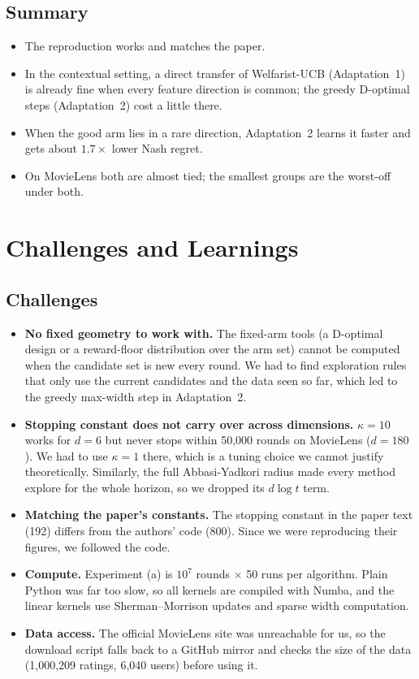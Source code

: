 \documentclass[11pt,a4paper]{article}
\begin{document}
\subsection{Summary}
\begin{itemize}
  \item The reproduction works and matches the paper.
  \item In the contextual setting, a direct transfer of Welfarist-UCB (Adaptation~1) is already fine when every feature direction is common; the greedy D-optimal steps (Adaptation~2) cost a little there.
  \item When the good arm lies in a rare direction, Adaptation~2 learns it faster and gets about $1.7\times$ lower Nash regret.
  \item On MovieLens both are almost tied; the smallest groups are the worst-off under both.
\end{itemize}

\section{Challenges and Learnings}

\subsection{Challenges}
\begin{itemize}
  \item \textbf{No fixed geometry to work with.} The fixed-arm tools (a D-optimal design or a reward-floor distribution over the arm set) cannot be computed when the candidate set is new every round. We had to find exploration rules that only use the current candidates and the data seen so far, which led to the greedy max-width step in Adaptation~2.
  \item \textbf{Stopping constant does not carry over across dimensions.} $\kappa=10$ works for $d=6$ but never stops within 50{,}000 rounds on MovieLens ($d=180$). We had to use $\kappa=1$ there, which is a tuning choice we cannot justify theoretically. Similarly, the full Abbasi-Yadkori radius made every method explore for the whole horizon, so we dropped its $d\log t$ term.
  \item \textbf{Matching the paper's constants.} The stopping constant in the paper text (192) differs from the authors' code (800). Since we were reproducing their figures, we followed the code.
  \item \textbf{Compute.} Experiment (a) is $10^7$ rounds $\times$ 50 runs per algorithm. Plain Python was far too slow, so all kernels are compiled with Numba, and the linear kernels use Sherman--Morrison updates and sparse width computation.
  \item \textbf{Data access.} The official MovieLens site was unreachable for us, so the download script falls back to a GitHub mirror and checks the size of the data (1{,}000{,}209 ratings, 6{,}040 users) before using it.
\end{itemize}
\end{document}
